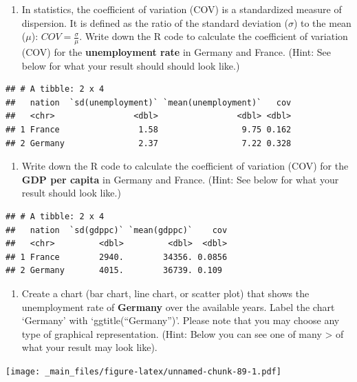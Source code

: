 \documentclass[
  12pt,
  oneside]{book}
\providecommand{\tightlist}{%
  \setlength{\itemsep}{0pt}\setlength{\parskip}{0pt}}
\begin{document}
\begin{enumerate}
\def\labelenumi{(\arabic{enumi})}
\setcounter{enumi}{18}
\tightlist
\item
  In statistics, the coefficient of variation (COV) is a standardized measure of
  dispersion. It is defined as the ratio of the standard deviation (\(\sigma\)) to the mean (\(\mu\)):
  \(COV={\frac {\sigma }{\mu }}\).
  Write down the R code to calculate the coefficient of variation (COV) for the
  \textbf{unemployment rate} in Germany and France. (Hint: See below for what your result should should look like.)
\end{enumerate}

\begin{verbatim}
## # A tibble: 2 x 4
##   nation  `sd(unemployment)` `mean(unemployment)`   cov
##   <chr>                <dbl>                <dbl> <dbl>
## 1 France                1.58                 9.75 0.162
## 2 Germany               2.37                 7.22 0.328
\end{verbatim}

\begin{enumerate}
\def\labelenumi{(\arabic{enumi})}
\setcounter{enumi}{19}
\tightlist
\item
  Write down the R code to calculate the coefficient of variation (COV) for the \textbf{GDP per capita}
  in Germany and France. (Hint: See below for what your result should look like.)
\end{enumerate}

\begin{verbatim}
## # A tibble: 2 x 4
##   nation  `sd(gdppc)` `mean(gdppc)`    cov
##   <chr>         <dbl>         <dbl>  <dbl>
## 1 France        2940.        34356. 0.0856
## 2 Germany       4015.        36739. 0.109
\end{verbatim}

\begin{enumerate}
\def\labelenumi{(\arabic{enumi})}
\setcounter{enumi}{20}
\tightlist
\item
  Create a chart (bar chart, line chart, or scatter plot) that shows the
  unemployment rate of \textbf{Germany} over the available years. Label the chart
  `Germany' with `ggtitle(``Germany'')'. Please note that you may choose any type of graphical representation.
  (Hint: Below you can see one of many \textbar\textgreater{} of what your result may look like).
\end{enumerate}

\texttt{[image: \_main\_files/figure-latex/unnamed-chunk-89-1.pdf]}
\end{document}
